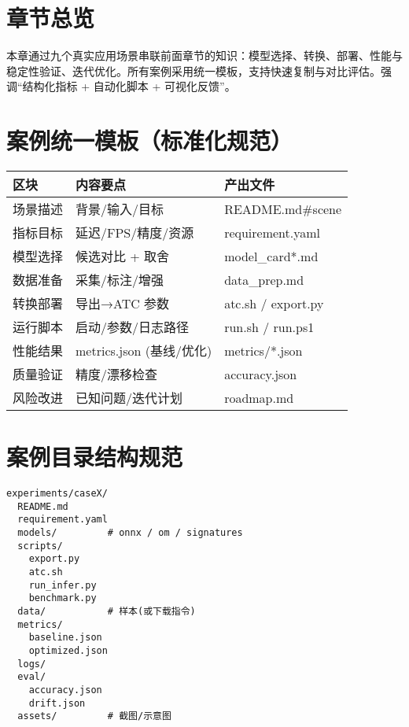 \section{章节总览}\label{ux7ae0ux8282ux603bux89c8}

本章通过九个真实应用场景串联前面章节的知识：模型选择、转换、部署、性能与稳定性验证、迭代优化。所有案例采用统一模板，支持快速复制与对比评估。强调``结构化指标
+ 自动化脚本 + 可视化反馈''。

\section{案例统一模板（标准化规范）}\label{ux6848ux4f8bux7edfux4e00ux6a21ux677fux6807ux51c6ux5316ux89c4ux8303}

\begin{longtable}[]{@{}lll@{}}
\toprule\noalign{}
区块 & 内容要点 & 产出文件 \\
\midrule\noalign{}
\endhead
\bottomrule\noalign{}
\endlastfoot
场景描述 & 背景/输入/目标 & README.md\#scene \\
指标目标 & 延迟/FPS/精度/资源 & requirement.yaml \\
模型选择 & 候选对比 + 取舍 & model\_card*.md \\
数据准备 & 采集/标注/增强 & data\_prep.md \\
转换部署 & 导出→ATC 参数 & atc.sh / export.py \\
运行脚本 & 启动/参数/日志路径 & run.sh / run.ps1 \\
性能结果 & metrics.json (基线/优化) & metrics/*.json \\
质量验证 & 精度/漂移检查 & accuracy.json \\
风险改进 & 已知问题/迭代计划 & roadmap.md \\
\end{longtable}

\section{案例目录结构规范}\label{ux6848ux4f8bux76eeux5f55ux7ed3ux6784ux89c4ux8303}

\begin{lstlisting}
experiments/caseX/
  README.md
  requirement.yaml
  models/         # onnx / om / signatures
  scripts/
    export.py
    atc.sh
    run_infer.py
    benchmark.py
  data/           # 样本(或下载指令)
  metrics/
    baseline.json
    optimized.json
  logs/
  eval/
    accuracy.json
    drift.json
  assets/         # 截图/示意图
\end{lstlisting}

